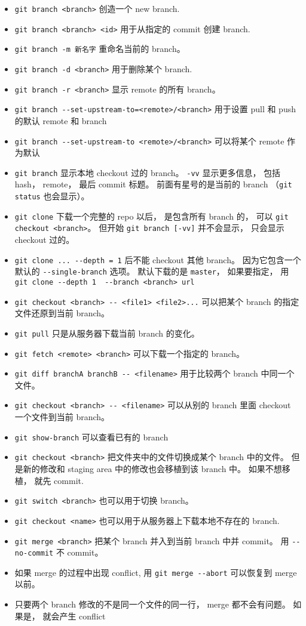 \begin{itemize}
\item \verb|git branch <branch>| 创造一个 new branch.
\item \verb|git branch <branch> <id>| 用于从指定的 commit 创建 branch.
\item \verb|git branch -m 新名字| 重命名当前的 branch。
\item \verb|git branch -d <branch>| 用于删除某个 branch.
\item \verb|git branch -r <branch>| 显示 remote 的所有 branch。
\item \verb|git branch --set-upstream-to=<remote>/<branch>| 用于设置 pull 和 push 的默认 remote 和 branch
\item \verb|git branch --set-upstream-to <remote>/<branch>| 可以将某个 remote 作为默认
\item \verb|git branch| 显示本地 checkout 过的 branch。 \verb|-vv| 显示更多信息， 包括 hash， remote， 最后 commit 标题。 前面有星号的是当前的 branch （\verb|git status| 也会显示）。
\item \verb|git clone| 下载一个完整的 repo 以后， 是包含所有 branch 的， 可以 \verb|git checkout <branch>|。 但开始 \verb|git branch [-vv]| 并不会显示， 只会显示 checkout 过的。
\item \verb|git clone ... --depth = 1| 后不能 checkout 其他 branch。 因为它包含一个默认的 \verb|--single-branch| 选项。 默认下载的是 \verb|master|， 如果要指定， 用 \verb|git clone --depth 1  --branch <branch> url|
\item \verb|git checkout <branch> -- <file1> <file2>...| 可以把某个 branch 的指定文件还原到当前 branch。
\item \verb|git pull| 只是从服务器下载当前 branch 的变化。
\item \verb|git fetch <remote> <branch>| 可以下载一个指定的 branch。
\item \verb|git diff branchA branchB -- <filename>| 用于比较两个 branch 中同一个文件。
\item \verb|git checkout <branch> -- <filename>| 可以从别的 branch 里面 checkout 一个文件到当前 branch。

\item \verb|git show-branch| 可以查看已有的 branch 
\item \verb|git checkout <branch>| 把文件夹中的文件切换成某个 branch 中的文件。 但是新的修改和 staging area 中的修改也会移植到该 branch 中。 如果不想移植， 就先 commit.
\item \verb|git switch <branch>| 也可以用于切换 branch。
\item \verb|git checkout <name>| 也可以用于从服务器上下载本地不存在的 branch.
\item \verb|git merge <branch>| 把某个 branch 并入到当前 branch 中并 commit。 用 \verb|--no-commit| 不 commit。
\item 如果 merge 的过程中出现 conflict, 用 \verb|git merge --abort| 可以恢复到 merge 以前。
\item 只要两个 branch 修改的不是同一个文件的同一行， merge 都不会有问题。 如果是， 就会产生 conflict




\end{itemize}

